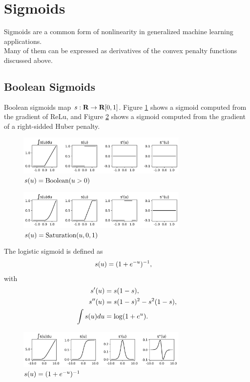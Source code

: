 \documentclass{article}
\begin{document}
\clearpage

\section{Sigmoids}
Sigmoids are a common form of nonlinearity in generalized machine learning applications.\\
Many of them can be expressed as derivatives of the convex penalty functions discussed above.

\subsection{Boolean Sigmoids}

    Boolean sigmoids map $s:\textbf{R}\to\textbf{R}[0,1]$.
    Figure \ref{fig:relu_sig} shows a sigmoid computed from the gradient of ReLu, and Figure \ref{fig:soft_relu_sig} shows a sigmoid computed from
    the gradient of a right-sidded Huber penalty.
    \begin{figure}[h!]
        \centering
        \includegraphics[width=0.75\textwidth]{./figs/nn/sig/relu.png}
        \caption{$s(u)=\text{Boolean}(u>0)$}
        \label{fig:relu_sig}
    \end{figure}
    \begin{figure}[h!]
        \centering
        \includegraphics[width=0.75\textwidth]{./figs/nn/sig/soft_relu.png}
        \caption{$s(u)=\text{Saturation}(u,0,1)$}
        \label{fig:soft_relu_sig}
    \end{figure}

    The logistic sigmoid is defined as
    \begin{align*}
        s(u) &= (1+e^{-u})^{-1},
    \end{align*}
    with
    \begin{align*}
        s'(u)&=s(1-s),\\
        s''(u)&=s(1-s)^2-s^2(1-s),\\
        \int s(u) du&= \log(1+e^u).
    \end{align*}
    \begin{figure}[h!]
        \centering
        \includegraphics[width=0.75\textwidth]{./figs/nn/sig/logistic.png}
        \caption{$s(u)=(1+e^{-u})^{-1}$}
        \label{fig:logistic}
    \end{figure}
\end{document}
